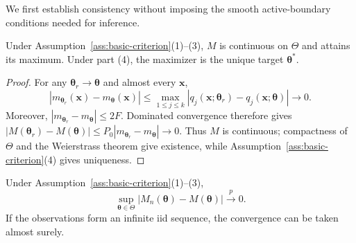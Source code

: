 We first establish consistency without imposing the smooth active-boundary
conditions needed for inference.

\begin{proposition}
\label{prop:population-existence}
Under Assumption~\ref{ass:basic-criterion}(1)--(3), $M$ is continuous on
$\Theta$ and attains its maximum.  Under part (4), the maximizer is the unique
target $\boldsymbol{\theta}^*$.
\end{proposition}

\begin{proof}
For any $\boldsymbol\theta_r\to\boldsymbol\theta$ and almost every $\mathbf x$,
\[
 |m_{\boldsymbol\theta_r}(\mathbf x)-m_{\boldsymbol\theta}(\mathbf x)|
 \leq \max_{1\leq j\leq k}|q_j(\mathbf x;\boldsymbol\theta_r)
                         -q_j(\mathbf x;\boldsymbol\theta)|\longrightarrow0.
\]
Moreover, $|m_{\boldsymbol\theta_r}-m_{\boldsymbol\theta}|\leq2F$. Dominated
convergence therefore gives
$|M(\boldsymbol\theta_r)-M(\boldsymbol\theta)|\leq
P_0|m_{\boldsymbol\theta_r}-m_{\boldsymbol\theta}|\to0$.
Thus $M$ is continuous; compactness of $\Theta$ and the Weierstrass theorem
give existence, while Assumption~\ref{ass:basic-criterion}(4) gives uniqueness.
\end{proof}

\begin{theorem}
\label{thm:uniform-convergence}
Under Assumption~\ref{ass:basic-criterion}(1)--(3),
\begin{equation}
 \sup_{\boldsymbol{\theta}\in\Theta}|M_n(\boldsymbol{\theta})-M(\boldsymbol{\theta})|\xrightarrow{p}0.
 \label{eq:uniform-convergence}
\end{equation}
If the observations form an infinite iid sequence, the convergence can be
taken almost surely.
\end{theorem}

